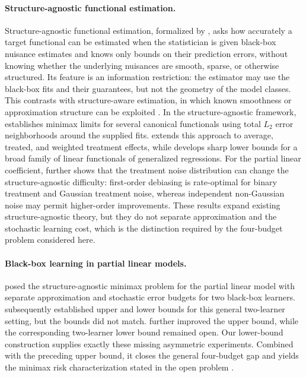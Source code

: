 \documentclass[11pt]{article}
\begin{document}
\paragraph{Structure-agnostic functional estimation.}
Structure-agnostic functional estimation, formalized by
\citet{balakrishnan2026fundamental}, asks how accurately a target functional
can be estimated when the statistician is given black-box nuisance estimates
and knows only bounds on their prediction errors, without knowing whether the
underlying nuisances are smooth, sparse, or otherwise structured. Its feature is an information restriction: the estimator may use the
black-box fits and their guarantees, but not the geometry of the model classes. This contrasts with structure-aware estimation, in
which known smoothness or approximation structure can be exploited \citep{robins2008higher,robins2017minimax}. In the
structure-agnostic framework, \citet{balakrishnan2026fundamental} establishes
minimax limits for several canonical functionals using total $L_2$ error
neighborhoods around the supplied fits. \citet{jin2025structure} extends this
approach to average, treated, and weighted treatment effects, while \citet{jin2026sharp} develops sharp lower bounds for a broad family of linear functionals of generalized regressions. For the partial linear coefficient, \citet{jin2025hard} further shows that the treatment noise distribution can change the structure-agnostic difficulty: first-order debiasing is rate-optimal for binary treatment and Gaussian treatment noise, whereas independent non-Gaussian noise may permit higher-order improvements. These results expand existing structure-agnostic theory, but they do not separate approximation and the stochastic learning cost, which is the distinction required by the four-budget problem considered here.

\paragraph{Black-box learning in partial linear models.}
\citet{gu2025open} posed the structure-agnostic minimax problem for the partial
linear model with separate approximation and stochastic error budgets for two
black-box learners. \citet{gu2026taming} subsequently established upper and
lower bounds for this general two-learner setting, but the bounds did not
match. \citet{gu2026optimal} further improved the upper bound, while the
corresponding two-learner lower bound remained open. Our lower-bound construction supplies exactly these missing
asymmetric experiments.  Combined with the preceding upper bound, it closes the general four-budget gap and yields the minimax risk characterization stated in the open problem \citep{gu2025open}.
\fi
\end{document}
